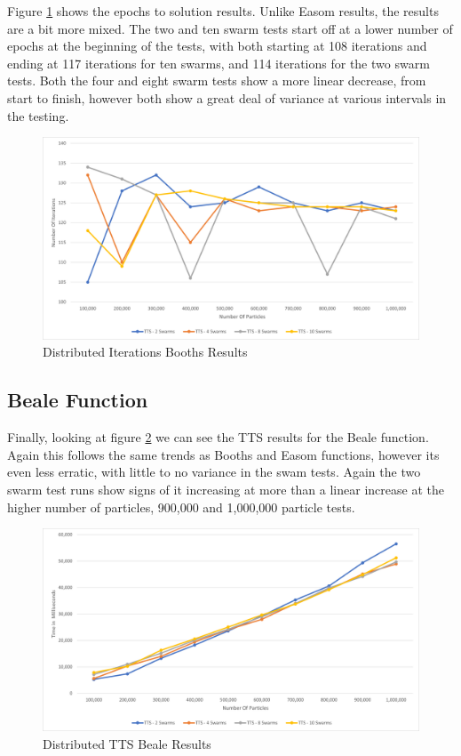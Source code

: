 \documentclass[oneside,12pt]{book}
\begin{document}
Figure \ref{fig:Distributed_Epoc_Booths_Results} shows the epochs to solution results. Unlike Easom results, the results are a bit more mixed. The two and ten swarm tests start off at a lower number of epochs at the beginning of the tests, with both starting at 108 iterations and ending at 117 iterations for ten swarms, and 114 iterations for the two swarm tests. Both the four and eight swarm tests show a more linear decrease, from start to finish, however both show a great deal of variance at various intervals in the testing. 

\begin{figure}[H]
    \centering
    \includegraphics[scale=0.45]{Images/Graphs/DistributedBoothsEpoch.png}
    \caption{Distributed Iterations Booths Results}
    \label{fig:Distributed_Epoc_Booths_Results}
\end{figure}

\subsection{Beale Function}
Finally, looking at figure \ref{fig:Distributed_TTS_Beale_Results} we can see the TTS results for the Beale function. Again this follows the same trends as Booths and Easom functions, however its even less erratic, with little to no variance in the swam tests. Again the two swarm test runs show signs of it increasing at more than a linear increase at the higher number of particles, 900,000 and 1,000,000 particle tests. 
\begin{figure}[H]
    \centering
    \includegraphics[scale=0.45]{Images/Graphs/DistributedBealeTTS.png}
    \caption{Distributed TTS Beale Results}
    \label{fig:Distributed_TTS_Beale_Results}
\end{figure}
\end{document}
